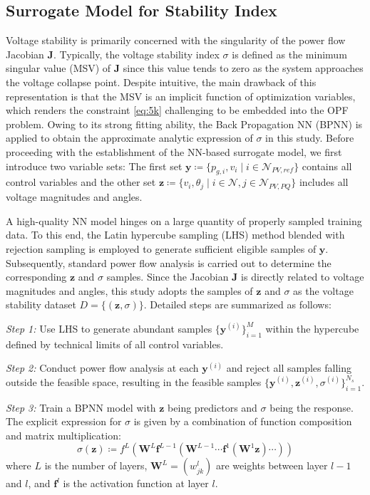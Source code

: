 \documentclass[journal]{IEEEtran}
\theoremstyle{definition}
\theoremstyle{remark}
\begin{document}
\subsection{Surrogate Model for Stability Index}
Voltage stability is primarily concerned with the singularity of the power flow Jacobian $\boldsymbol{J}$. Typically, the voltage stability index $\sigma$ is defined as the minimum singular value (MSV) of $\boldsymbol{J}$ since this value tends to zero as the system approaches the voltage collapse point. Despite intuitive, the main drawback of this representation is that the MSV is an implicit function of optimization variables, which renders the constraint \eqref{eq:5k} challenging to be embedded into the OPF problem. Owing to its strong fitting ability, the Back Propagation NN (BPNN) is applied to obtain the approximate analytic expression of $\sigma$ in this study. 
Before proceeding with the establishment of the NN-based surrogate model, we first introduce two variable sets: The first set $\boldsymbol{y}\coloneqq\{p_{g,i},v_i\mid i\in\mathcal{N}_{PV,ref}\}$ contains all control variables and the other set $\boldsymbol{z}\coloneqq\{v_i,\theta_j\mid i\in\mathcal{N},j\in\mathcal{N}_{PV,PQ}\}$ includes all voltage magnitudes and angles.  

A high-quality NN model hinges on a large quantity of properly sampled training data. To this end, the Latin hypercube sampling (LHS) method blended with rejection sampling is employed to generate sufficient eligible samples of $\boldsymbol{y}$. Subsequently, standard power flow analysis is carried out to determine the corresponding $\boldsymbol{z}$ and $\sigma$ samples.
Since the Jacobian $\boldsymbol{J}$ is directly related to voltage magnitudes and angles, this study adopts the samples of $\boldsymbol{z}$ and $\sigma$ as the voltage stability dataset $D=\{(\boldsymbol{z},\sigma)\}$. Detailed steps are summarized as follows:

\textit{Step 1:} Use LHS to generate abundant samples $\{\boldsymbol{y}^{(i)}\}_{i=1}^{M}$ within the hypercube defined by technical limits of all control variables.

\textit{Step 2:} Conduct power flow analysis at each $\boldsymbol{y}^{(i)}$ and reject all samples falling outside the feasible space, resulting in the feasible samples $\{\boldsymbol{y}^{(i)},\boldsymbol{z}^{(i)},\sigma^{(i)}\}_{i=1}^{N_s}$.

\textit{Step 3:} Train a BPNN model with $\boldsymbol{z}$ being predictors and $\sigma$ being the response. The explicit expression for $\sigma$ is given by a combination of function composition and matrix multiplication:
\begin{equation}\label{eq:6}
        \sigma(\boldsymbol{z})\coloneqq f^{L}(\boldsymbol{W}^{L}\boldsymbol{f}^{L-1}(\boldsymbol{W}^{L-1}\cdots\boldsymbol{f}^{1}(\boldsymbol{W}^{1}\boldsymbol{z})\cdots))
\end{equation}
where $L$ is the number of layers, $\boldsymbol{W}^{L}=(w_{jk}^l)$ are weights between layer $l-1$ and $l$, and $\boldsymbol{f}^l$ is the activation function at layer $l$.
\end{document}
